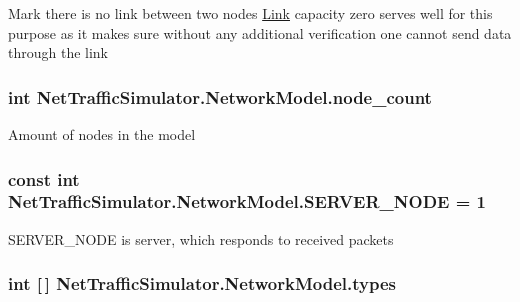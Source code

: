 Mark there is no link between two nodes \hyperlink{classNetTrafficSimulator_1_1Link}{Link} capacity zero serves well for this purpose as it makes sure without any additional verification one cannot send data through the link \hypertarget{classNetTrafficSimulator_1_1NetworkModel_a85f9941bb3af088bd078b273f0cb4e52}{
\subsubsection[{node\-\_\-count}]{\setlength{\rightskip}{0pt plus 5cm}int Net\-Traffic\-Simulator.\-Network\-Model.\-node\-\_\-count\hspace{0.3cm}{\ttfamily [private]}}}\label{classNetTrafficSimulator_1_1NetworkModel_a85f9941bb3af088bd078b273f0cb4e52}
Amount of nodes in the model \hypertarget{classNetTrafficSimulator_1_1NetworkModel_a9f536ecef65ce9ef55b52afa90ae8438}{
\subsubsection[{S\-E\-R\-V\-E\-R\-\_\-\-N\-O\-D\-E}]{\setlength{\rightskip}{0pt plus 5cm}const int Net\-Traffic\-Simulator.\-Network\-Model.\-S\-E\-R\-V\-E\-R\-\_\-\-N\-O\-D\-E = 1}}\label{classNetTrafficSimulator_1_1NetworkModel_a9f536ecef65ce9ef55b52afa90ae8438}
S\-E\-R\-V\-E\-R\-\_\-\-N\-O\-D\-E is server, which responds to received packets \hypertarget{classNetTrafficSimulator_1_1NetworkModel_aa8f0b62fb9e9029f0068135b56a46a9c}{
\subsubsection[{types}]{\setlength{\rightskip}{0pt plus 5cm}int \mbox{[}$\,$\mbox{]} Net\-Traffic\-Simulator.\-Network\-Model.\-types\hspace{0.3cm}{\ttfamily [private]}}}\label{classNetTrafficSimulator_1_1NetworkModel_aa8f0b62fb9e9029f0068135b56a46a9c}
